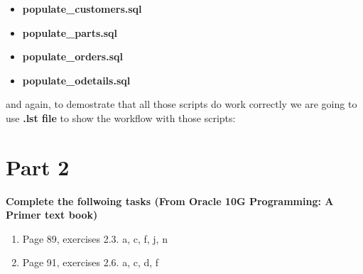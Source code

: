 \documentclass{article}
\newenvironment{problem}[1][\unskip]%
{\centering\textbf{ #1}%
\vspace{0.5cm}
\begin{em}}%
{\end{em}}
\newenvironment{answer}%
{\begin{framed}%
\vspace{0.5cm}}%
{\end{framed}\vspace{0.5cm}}
\begin{document}
\begin{answer}
\begin{enumerate}
\begin{itemize}
				\item \textbf{populate\_customers.sql}
						
				
				\item \textbf{populate\_parts.sql}
						

				\item \textbf{populate\_orders.sql}
						

				\item \textbf{populate\_odetails.sql}
						
			\end{itemize}

			and again, to demostrate that all those scripts do work correctly we are going to use \textbf{.lst file} to show the workflow with those scripts:

					
		\end{enumerate}
	\end{answer}

	\newpage
	\section{Part 2}
	\begin{problem}[Complete the follwoing tasks (From Oracle 10G Programming: A Primer text book)]
		\begin{enumerate}
			\item Page 89, exercises 2.3. a, c, f, j, n
			\item Page 91, exercises 2.6. a, c, d, f
		\end{enumerate}
	\end{problem}
\end{document}
